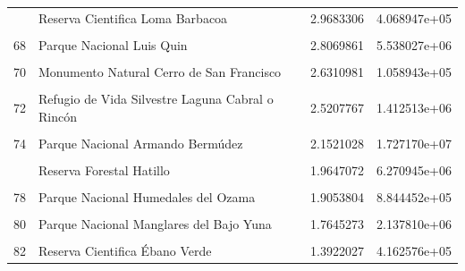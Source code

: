 \documentclass[10pt,landscape,a3paper]{article}
\begin{document}
\begin{longtable}[t]{llrr}
\addlinespace
66 & Reserva Cientifica Loma Barbacoa & 2.9683306 & 4.068947e+05\\
\cellcolor{lightgray}{67} & \cellcolor{lightgray}{Monumento Natural Saltos de Jima} & \cellcolor{lightgray}{2.9440900} & \cellcolor{lightgray}{5.465493e+05}\\
68 & Parque Nacional Luis Quin & 2.8069861 & 5.538027e+06\\
\cellcolor{lightgray}{69} & \cellcolor{lightgray}{Via Panoramica Carretera El Abanico - Constanza} & \cellcolor{lightgray}{2.7128399} & \cellcolor{lightgray}{6.170540e+05}\\
70 & Monumento Natural Cerro de San Francisco & 2.6310981 & 1.058943e+05\\
\addlinespace
\cellcolor{lightgray}{71} & \cellcolor{lightgray}{Parque Nacional Baiguate} & \cellcolor{lightgray}{2.5817049} & \cellcolor{lightgray}{1.353512e+06}\\
72 & Refugio de Vida Silvestre Laguna Cabral o Rincón & 2.5207767 & 1.412513e+06\\
\cellcolor{lightgray}{73} & \cellcolor{lightgray}{Reserva Forestal Guanito} & \cellcolor{lightgray}{2.2209652} & \cellcolor{lightgray}{1.531254e+06}\\
74 & Parque Nacional Armando Bermúdez & 2.1521028 & 1.727170e+07\\
\cellcolor{lightgray}{75} & \cellcolor{lightgray}{Corredor Ecologico Autopista Duarte} & \cellcolor{lightgray}{2.0818581} & \cellcolor{lightgray}{2.158105e+05}\\
\addlinespace
76 & Reserva Forestal Hatillo & 1.9647072 & 6.270945e+06\\
\cellcolor{lightgray}{77} & \cellcolor{lightgray}{Parque Nacional La Gran Sabana} & \cellcolor{lightgray}{1.9438134} & \cellcolor{lightgray}{4.268147e+06}\\
78 & Parque Nacional Humedales del Ozama & 1.9053804 & 8.844452e+05\\
\cellcolor{lightgray}{79} & \cellcolor{lightgray}{Reserva Cientifica Loma Guaconejo} & \cellcolor{lightgray}{1.8671873} & \cellcolor{lightgray}{4.363857e+05}\\
80 & Parque Nacional Manglares del Bajo Yuna & 1.7645273 & 2.137810e+06\\
\addlinespace
\cellcolor{lightgray}{81} & \cellcolor{lightgray}{Reserva Forestal Arroyo Cano} & \cellcolor{lightgray}{1.4002585} & \cellcolor{lightgray}{3.346449e+05}\\
82 & Reserva Cientifica Ébano Verde & 1.3922027 & 4.162576e+05\\

\end{longtable}
\end{document}
